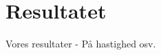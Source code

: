 \documentclass[class=report, crop=false]{standalone}
\begin{document}
    \section{Resultatet}
    Vores resultater -\> På hastighed osv.
\end{document}
